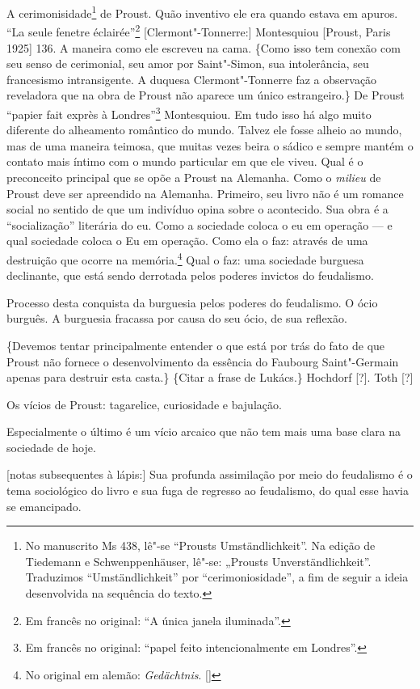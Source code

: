 A cerimonisidade\footnote{No manuscrito Ms 438, lê"-se ``Prousts
  Umständlichkeit''. Na edição de Tiedemann e Schwenppenhäuser, lê"-se:
  „Prousts Unverständlichkeit”. Traduzimos ``Umständlichkeit'' por
  ``cerimoniosidade'', a fim de seguir a ideia desenvolvida na sequência
  do texto. \versal{[N.~T.]}} de Proust. Quão inventivo ele era quando estava em apuros.
``La seule fenetre éclairée''\footnote{Em francês no original: ``A
  única janela iluminada''. \versal{[N.~T.]}} {[}Clermont"-Tonnerre:{]} Montesquiou
{[}Proust, Paris 1925{]} 136. A maneira como ele escreveu na cama.
\{Como isso tem conexão com seu senso de cerimonial, seu amor por
Saint"-Simon, sua intolerância, seu francesismo intransigente. A duquesa
Clermont"-Tonnerre faz a observação reveladora que na obra de Proust não
aparece um único estrangeiro.\} De Proust ``papier fait exprès à
Londres''\footnote{Em francês no original: ``papel feito intencionalmente em Londres''. \versal{[N.~T.]}} Montesquiou. Em tudo isso há algo muito
diferente do alheamento romântico do mundo. Talvez ele fosse alheio ao
mundo, mas de uma maneira teimosa, que muitas vezes beira o sádico e
sempre mantém o contato mais íntimo com o mundo particular em que ele
viveu. Qual é o preconceito principal que se opõe a Proust na Alemanha.
Como o \emph{milieu} de Proust deve ser apreendido na Alemanha.
Primeiro, seu livro não é um romance social no sentido de que um
indivíduo opina sobre o acontecido. Sua obra é a ``socialização''
literária do eu. Como a sociedade coloca o eu em operação --- e qual
sociedade coloca o Eu em operação. Como ela o faz: através de uma
destruição que ocorre na memória.\footnote{No original em alemão: \emph{Gedächtnis}. []} Qual o faz: uma
sociedade burguesa declinante, que está sendo derrotada pelos poderes
invictos do feudalismo.

Processo desta conquista da burguesia pelos poderes do feudalismo. O
ócio burguês. A burguesia fracassa por causa do seu ócio, de sua
reflexão.

\{Devemos tentar principalmente entender o que está por trás do
fato de que Proust não fornece o desenvolvimento da essência do Faubourg
Saint"-Germain apenas para destruir esta casta.\} \{Citar a frase de
Lukács.\} Hochdorf {[}?{]}. Toth {[}?{]}

Os vícios de Proust: tagarelice, curiosidade e bajulação.

Especialmente o último é um vício arcaico que não tem mais uma base
clara na sociedade de hoje.

{[}notas subsequentes à lápis:{]} Sua profunda assimilação por meio do
feudalismo é o tema sociológico do livro e sua fuga de regresso ao
feudalismo, do qual esse havia se emancipado.

